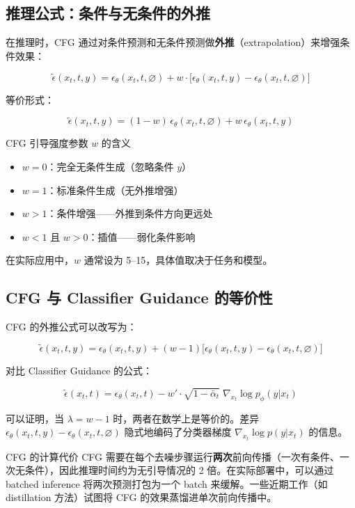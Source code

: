 \subsection{推理公式：条件与无条件的外推}

在推理时，CFG 通过对条件预测和无条件预测做\textbf{外推}（extrapolation）来增强条件效果：

$$
\tilde{\epsilon}(x_t, t, y) = \epsilon_\theta(x_t, t, \varnothing) + w \cdot \bigl[\epsilon_\theta(x_t, t, y) - \epsilon_\theta(x_t, t, \varnothing)\bigr]
$$

等价形式：

$$
\tilde{\epsilon}(x_t, t, y) = (1-w)\,\epsilon_\theta(x_t, t, \varnothing) + w\,\epsilon_\theta(x_t, t, y)
$$

\begin{importantbox}{CFG 引导强度参数 $w$ 的含义}
\begin{itemize}
    \item $w = 0$：完全无条件生成（忽略条件 $y$）
    \item $w = 1$：标准条件生成（无外推增强）
    \item $w > 1$：条件增强——外推到条件方向更远处
    \item $w < 1$ 且 $w > 0$：插值——弱化条件影响
\end{itemize}
在实际应用中，$w$ 通常设为 5--15，具体值取决于任务和模型。
\end{importantbox}

\subsection{CFG 与 Classifier Guidance 的等价性}

CFG 的外推公式可以改写为：

$$
\tilde{\epsilon}(x_t, t, y) = \epsilon_\theta(x_t, t, y) + (w-1)\bigl[\epsilon_\theta(x_t, t, y) - \epsilon_\theta(x_t, t, \varnothing)\bigr]
$$

对比 Classifier Guidance 的公式：

$$
\tilde{\epsilon}(x_t, t) = \epsilon_\theta(x_t, t) - w'\cdot\sqrt{1-\bar\alpha_t}\;\nabla_{x_t}\log p_\phi(y|x_t)
$$

可以证明，当 $\lambda = w - 1$ 时，两者在数学上是等价的。差异 $\epsilon_\theta(x_t, t, y) - \epsilon_\theta(x_t, t, \varnothing)$ 隐式地编码了分类器梯度 $\nabla_{x_t}\log p(y|x_t)$ 的信息。

\begin{warningbox}{CFG 的计算代价}
CFG 需要在每个去噪步骤运行\textbf{两次}前向传播（一次有条件、一次无条件），因此推理时间约为无引导情况的 2 倍。在实际部署中，可以通过 batched inference 将两次预测打包为一个 batch 来缓解。一些近期工作（如 distillation 方法）试图将 CFG 的效果蒸馏进单次前向传播中。
\end{warningbox}

